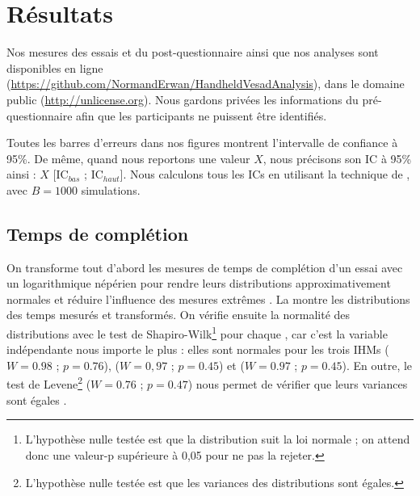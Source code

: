 \section{Résultats}
\label{sec:experiment_results}

Nos mesures des essais et du post-questionnaire ainsi que nos analyses sont disponibles en ligne (\url{https://github.com/NormandErwan/HandheldVesadAnalysis}), dans le domaine public (\url{http://unlicense.org}). Nous gardons privées les informations du pré-questionnaire afin que les participants ne puissent être identifiés.

Toutes les barres d'erreurs dans nos figures montrent l'intervalle de confiance à 95\%. De même, quand nous reportons une valeur $X$, nous précisons son IC à 95\% ainsi : $X$ [$\text{IC}_{bas}$ ; $\text{IC}_{haut}$]. Nous calculons tous les ICs en utilisant la technique de  \citep[p. 25]{Dragicevic2016}, avec $B=1000$ simulations.

\subsection{Temps de complétion}
\label{subsec:experiment_results_time}


On transforme tout d'abord les mesures de temps de complétion d'un essai avec un logarithmique népérien pour rendre leurs distributions approximativement normales et réduire l'influence des mesures extrêmes \citep[p. 25]{Dragicevic2016}. La  montre les distributions des temps mesurés et transformés. On vérifie ensuite la normalité des distributions avec le test de Shapiro-Wilk\footnote{L'hypothèse nulle testée est que la distribution suit la loi normale ; on attend donc une valeur-p supérieure à 0,05 pour ne pas la rejeter.} \citep{Wobbrock2016} pour chaque , car c'est la variable indépendante nous importe le plus : elles sont normales pour les trois IHMs  ($W = \num{0.98}$ ; $p = \num{0.76}$),  ($W = 0,97$ ; $p = \num{0.45}$) et  ($W = \num{0.97}$ ; $p = \num{0.45}$). En outre, le test de Levene\footnote{L'hypothèse nulle testée est que les variances des distributions sont égales.} ($W = \num{0.76}$ ; $p = \num{0.47}$) nous permet de vérifier que leurs variances sont égales \citep{Wobbrock2016}.

